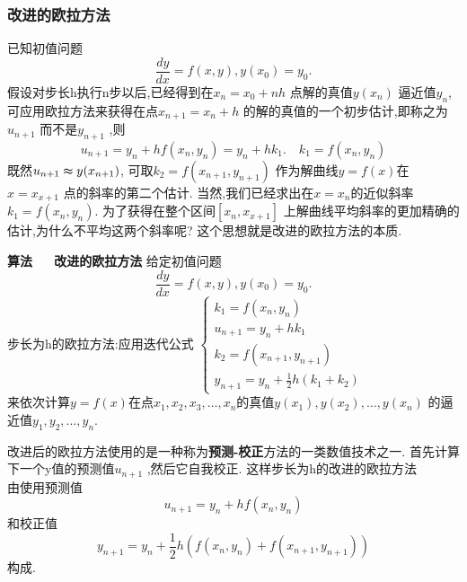 \documentclass{article}
\begin{document}
\subsubsection{改进的欧拉方法}
已知初值问题
\begin{equation}
  \frac{dy}{dx}=f(x,y),y(x_0)=y_0.
\end{equation}
假设对步长h执行n步以后,已经得到在$x_n=x_0+nh$ 点解的真值$y(x_n)$ 逼近值$y_n$, 可应用欧拉方法来获得在点$x_{n+1}=x_n+h$ 的解的真值的一个初步估计,即称之为$u_{n+1}$ 而不是$y_{n+1}$ ,则
\begin{equation}
  u_{n+1}=y_n+hf(x_n,y_n)=y_n+hk_1. \quad k_1=f(x_n,y_n)
\end{equation}
既然$u_{n+1}\thickapprox y(x_{n+1})$, 可取$k_2=f(x_{n+1},y_{n+1})$ 作为解曲线$y=f(x)$在$x=x_{x+1}$ 点的斜率的第二个估计. \newline
当然,我们已经求出在$x=x_n$的近似斜率$k_1=f(x_n,y_n)$. 为了获得在整个区间$[x_n,x_{x+1}]$ 上解曲线平均斜率的更加精确的估计,为什么不平均这两个斜率呢? \newline 这个思想就是改进的欧拉方法的本质.
\begin{theorem}
  {\bf 算法~~~改进的欧拉方法} \newline
给定初值问题
\begin{equation}
  \frac{dy}{dx}=f(x,y),y(x_0)=y_0.
\end{equation}
步长为h的欧拉方法:应用迭代公式
$
\begin{cases}
  k_1=f(x_n,y_n) \\
  u_{n+1}=y_n+hk_1 \\
  k_2=f(x_{n+1},y_{n+1}) \\
  y_{n+1}=y_n+\frac{1}{2}h(k_1+k_2)
\end{cases}
$
\\
来依次计算$y=f(x)$在点$x_1,x_2,x_3,\ldots,x_n$的真值$y(x_1),y(x_2),\ldots,y(x_n)$ 的逼近值$y_1,y_2,\ldots,y_n$. 
\end{theorem}
\begin{note}
  改进后的欧拉方法使用的是一种称为{\bf 预测-校正}方法的一类数值技术之一. 首先计算下一个y值的预测值$u_{n+1}$ ,然后它自我校正. 这样步长为h的改进的欧拉方法\\
  由使用预测值
  \begin{equation}
    u_{n+1}=y_n+hf(x_n,y_n)
  \end{equation}
  和校正值
  \begin{equation}
    y_{n+1}=y_n+\frac{1}{2}h(f(x_n,y_n)+f(x_{n+1},y_{n+1}))
  \end{equation}
  构成.
\end{note}
\end{document}
